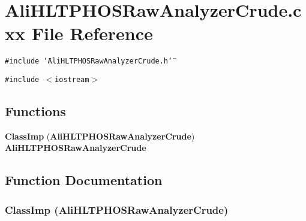 \section{Ali\-HLTPHOSRaw\-Analyzer\-Crude.cxx File Reference}
\label{AliHLTPHOSRawAnalyzerCrude_8cxx}
{\tt \#include \char`\"{}Ali\-HLTPHOSRaw\-Analyzer\-Crude.h\char`\"{}}\par
{\tt \#include $<$iostream$>$}\par
\subsection*{Functions}
\begin{CompactItemize}
\item 
{\bf Class\-Imp} ({\bf Ali\-HLTPHOSRaw\-Analyzer\-Crude}) {\bf Ali\-HLTPHOSRaw\-Analyzer\-Crude}
\end{CompactItemize}


\subsection{Function Documentation}
\subsubsection{\setlength{\rightskip}{0pt plus 5cm}Class\-Imp ({\bf Ali\-HLTPHOSRaw\-Analyzer\-Crude})}\label{AliHLTPHOSRawAnalyzerCrude_8cxx_a0}


